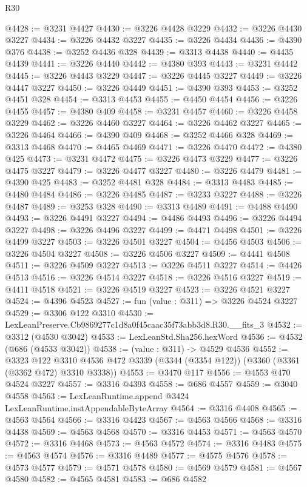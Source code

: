\begin{lexlean}{R30}
\begin{coremodule}
@4428 := @3231 @4427
@4430 := @3226 @4428 @3229
@4432 := @3226 @4430 @3227
@4434 := @3226 @4432 @3227
@4435 := @3226 @4434
@4436 := @4390 @376
@4438 := @3252 @4436 @328
@4439 := @3313 @4438
@4440 := @4435 @4439
@4441 := @3226 @4440
@4442 := @4380 @393
@4443 := @3231 @4442
@4445 := @3226 @4443 @3229
@4447 := @3226 @4445 @3227
@4449 := @3226 @4447 @3227
@4450 := @3226 @4449
@4451 := @4390 @393
@4453 := @3252 @4451 @328
@4454 := @3313 @4453
@4455 := @4450 @4454
@4456 := @3226 @4455
@4457 := @4380 @409
@4458 := @3231 @4457
@4460 := @3226 @4458 @3229
@4462 := @3226 @4460 @3227
@4464 := @3226 @4462 @3227
@4465 := @3226 @4464
@4466 := @4390 @409
@4468 := @3252 @4466 @328
@4469 := @3313 @4468
@4470 := @4465 @4469
@4471 := @3226 @4470
@4472 := @4380 @425
@4473 := @3231 @4472
@4475 := @3226 @4473 @3229
@4477 := @3226 @4475 @3227
@4479 := @3226 @4477 @3227
@4480 := @3226 @4479
@4481 := @4390 @425
@4483 := @3252 @4481 @328
@4484 := @3313 @4483
@4485 := @4480 @4484
@4486 := @3226 @4485
@4487 := @3233 @3227
@4488 := @3226 @4487
@4489 := @3253 @328
@4490 := @3313 @4489
@4491 := @4488 @4490
@4493 := @3226 @4491 @3227
@4494 := @4486 @4493
@4496 := @3226 @4494 @3227
@4498 := @3226 @4496 @3227
@4499 := @4471 @4498
@4501 := @3226 @4499 @3227
@4503 := @3226 @4501 @3227
@4504 := @4456 @4503
@4506 := @3226 @4504 @3227
@4508 := @3226 @4506 @3227
@4509 := @4441 @4508
@4511 := @3226 @4509 @3227
@4513 := @3226 @4511 @3227
@4514 := @4426 @4513
@4516 := @3226 @4514 @3227
@4518 := @3226 @4516 @3227
@4519 := @4411 @4518
@4521 := @3226 @4519 @3227
@4523 := @3226 @4521 @3227
@4524 := @4396 @4523
@4527 := fun (value : @311) => @3226 @4524 @3227
@4529 := @3306 @122 @3310
@4530 := LexLeanPreserve.Cb9869277c1d8a0f45caac35f73abb3d8.R30.__fits_3
@4532 := @3312 (@4530 @3042)
@4533 := LexLeanStd.Sha256.hexWord
@4536 := @4532 (@686 (@4533 @3042))
@4538 := (value : @311) -> @4529 @4536
@4552 := @3323
    @122
    @3310
    @4536
    @472
    @3339
    (@3344 (@3354 @122))
    (@3360 (@3361 (@3362 @472) @3310 @3338))
@4553 := @3470 @117
@4556 := @4553 @470 @4524 @3227
@4557 := @3316 @4393
@4558 := @686 @4557
@4559 := @3040 @4558
@4563 := LexLeanRuntime.append @3424 LexLeanRuntime.instAppendableByteArray
@4564 := @3316 @4408
@4565 := @4563 @4564
@4566 := @3316 @4423
@4567 := @4563 @4566
@4568 := @3316 @4438
@4569 := @4563 @4568
@4570 := @3316 @4453
@4571 := @4563 @4570
@4572 := @3316 @4468
@4573 := @4563 @4572
@4574 := @3316 @4483
@4575 := @4563 @4574
@4576 := @3316 @4489
@4577 := @4575 @4576
@4578 := @4573 @4577
@4579 := @4571 @4578
@4580 := @4569 @4579
@4581 := @4567 @4580
@4582 := @4565 @4581
@4583 := @686 @4582

\end{coremodule}
\end{lexlean}
